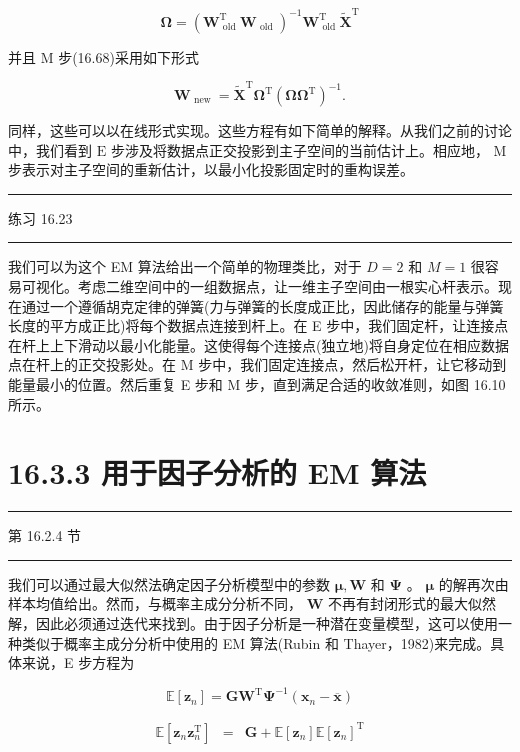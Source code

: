 \documentclass[10pt]{article}
\newcommand{\HRule}{\begin{center}\rule{0.9\linewidth}{0.2mm}\end{center}}
\begin{document}
\[
\mathbf{\Omega } = {\left( {\mathbf{W}}_{\text{ old }}^{\mathrm{T}}{\mathbf{W}}_{\text{ old }}\right) }^{-1}{\mathbf{W}}_{\text{ old }}^{\mathrm{T}}{\widetilde{\mathbf{X}}}^{\mathrm{T}} \tag{16.70}
\]

并且 M 步(16.68)采用如下形式

\[
{\mathbf{W}}_{\text{ new }} = {\widetilde{\mathbf{X}}}^{\mathrm{T}}{\mathbf{\Omega }}^{\mathrm{T}}{\left( \mathbf{\Omega }{\mathbf{\Omega }}^{\mathrm{T}}\right) }^{-1}. \tag{16.71}
\]

同样，这些可以以在线形式实现。这些方程有如下简单的解释。从我们之前的讨论中，我们看到 \(\mathrm{E}\) 步涉及将数据点正交投影到主子空间的当前估计上。相应地， \(\mathrm{M}\) 步表示对主子空间的重新估计，以最小化投影固定时的重构误差。

\HRule

练习 16.23

\HRule

我们可以为这个 EM 算法给出一个简单的物理类比，对于 \(D = 2\) 和 \(M = 1\) 很容易可视化。考虑二维空间中的一组数据点，让一维主子空间由一根实心杆表示。现在通过一个遵循胡克定律的弹簧(力与弹簧的长度成正比，因此储存的能量与弹簧长度的平方成正比)将每个数据点连接到杆上。在 E 步中，我们固定杆，让连接点在杆上上下滑动以最小化能量。这使得每个连接点(独立地)将自身定位在相应数据点在杆上的正交投影处。在 M 步中，我们固定连接点，然后松开杆，让它移动到能量最小的位置。然后重复 E 步和 M 步，直到满足合适的收敛准则，如图 16.10 所示。

\section*{16.3.3 用于因子分析的 EM 算法}

\HRule

第 16.2.4 节

\HRule

我们可以通过最大似然法确定因子分析模型中的参数 \(\mathbf{\mu },\mathbf{W}\) 和 \(\mathbf{\Psi }\) 。 \(\mathbf{\mu }\) 的解再次由样本均值给出。然而，与概率主成分分析不同， \(\mathbf{W}\) 不再有封闭形式的最大似然解，因此必须通过迭代来找到。由于因子分析是一种潜在变量模型，这可以使用一种类似于概率主成分分析中使用的 EM 算法(Rubin 和 Thayer，1982)来完成。具体来说，E 步方程为

\[
\mathbb{E}\left\lbrack  {\mathbf{z}}_{n}\right\rbrack   = {\mathbf{{GW}}}^{\mathrm{T}}{\mathbf{\Psi }}^{-1}\left( {{\mathbf{x}}_{n} - \overline{\mathbf{x}}}\right)  \tag{16.72}
\]

\[
\begin{matrix} \mathbb{E}\left\lbrack  {{\mathbf{z}}_{n}{\mathbf{z}}_{n}^{\mathrm{T}}}\right\rbrack  &  = & \mathbf{G} + \mathbb{E}\left\lbrack  {\mathbf{z}}_{n}\right\rbrack  \mathbb{E}{\left\lbrack  {\mathbf{z}}_{n}\right\rbrack  }^{\mathrm{T}} \end{matrix} \tag{16.73}
\]
\end{document}
